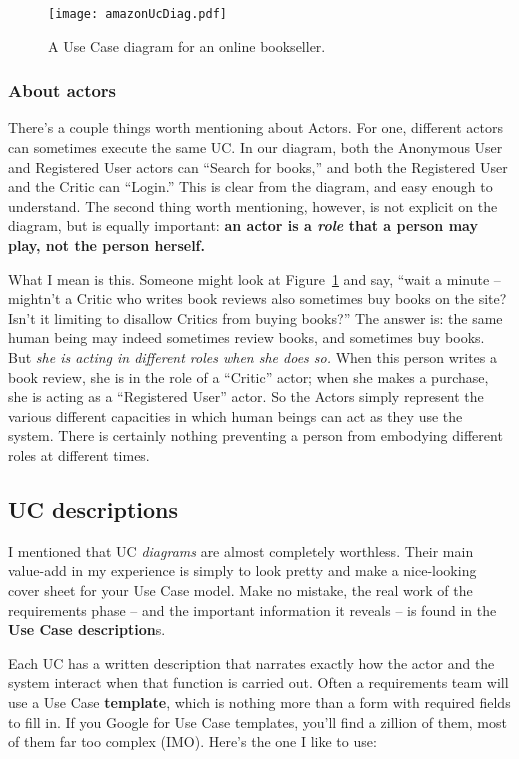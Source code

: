 \begin{figure}
\centering
\texttt{[image: amazonUcDiag.pdf]}
\caption{A Use Case diagram for an online bookseller.}
\label{fig:amazonUcDiag}
\end{figure}

\subsubsection{About actors}

There's a couple things worth mentioning about Actors. For one, different
actors can sometimes execute the same UC. In our diagram, both the Anonymous
User and Registered User actors can ``Search for books,'' and both the
Registered User and the Critic can ``Login.'' This is clear from the diagram,
and easy enough to understand. The second thing worth mentioning, however, is
not explicit on the diagram, but is equally important: \textbf{an actor is a
\textit{role} that a person may play, not the person herself.}

What I mean is this. Someone might look at Figure~\ref{fig:amazonUcDiag} and
say, ``wait a minute -- mightn't a Critic who writes book reviews also
sometimes buy books on the site? Isn't it limiting to disallow Critics from
buying books?'' The answer is: the same human being may indeed sometimes
review books, and sometimes buy books. But \textit{she is acting in different
roles when she does so.} When this person writes a book review, she is in the
role of a ``Critic'' actor; when she makes a purchase, she is acting as a
``Registered User'' actor. So the Actors simply represent the various
different capacities in which human beings can act as they use the system.
There is certainly nothing preventing a person from embodying different roles
at different times.

\subsection{UC descriptions}

I mentioned that UC \textit{diagrams} are almost completely worthless. Their
main value-add in my experience is simply to look pretty and make a
nice-looking cover sheet for your Use Case model. Make no mistake, the real
work of the requirements phase -- and the important information it reveals --
is found in the \textbf{Use Case description}s.

Each UC has a written description that narrates exactly how the actor and the
system interact when that function is carried out. Often a requirements team
will use a Use Case \textbf{template}, which is nothing more than a form with
required fields to fill in. If you Google for Use Case templates, you'll find
a zillion of them, most of them far too complex (IMO). Here's the one I like
to use:

